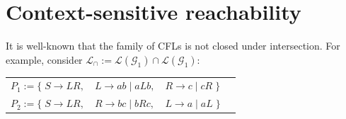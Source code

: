\documentclass[sigplan,review,anonymous,acmsmall]{acmart}\settopmatter{printfolios=false,printccs=false,printacmref=false}
\begin{document}

%
%

  \section{Context-sensitive reachability}

  It is well-known that the family of CFLs is not closed under intersection. For example, consider $\mathcal{L}_\cap := \mathcal{L}(\mathcal{G}_1) \cap \mathcal{L}(\mathcal{G}_1)$:

  \begin{table}[H]
  \begin{tabular}{llll}
    $P_1 := \big\{\;S \rightarrow L R,$ & $L \rightarrow a b \mid a L b,$ & $R \rightarrow c \mid c R\;\big\}$\vspace{5pt}\\
    $P_2 := \big\{\;S \rightarrow L R,$ & $R \rightarrow b c \mid b R c,$ & $L \rightarrow a \mid a L\;\big\}$
  \end{tabular}
  \end{table}
\end{document}
